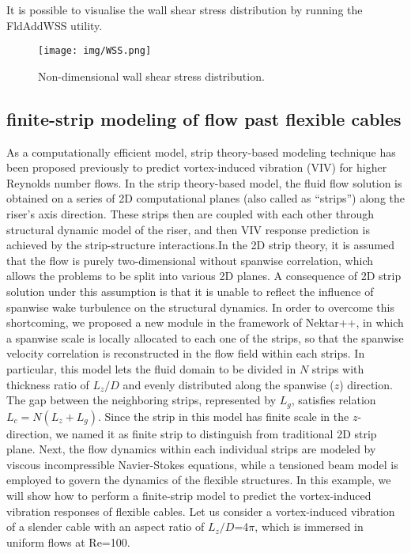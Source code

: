 It is possible to visualise the wall shear stress distribution by running the FldAddWSS utility.

\begin{figure}
\begin{center}
\texttt{[image: img/WSS.png]}
\caption{Non-dimensional wall shear stress distribution.}
\end{center}
\end{figure}

\subsection{finite-strip modeling of flow past flexible cables}

As a computationally efficient model, strip theory-based modeling technique has been proposed previously to predict vortex-induced vibration (VIV) for higher Reynolds number flows. In the strip theory-based model, the fluid flow solution is obtained on a series of 2D computational planes (also called as “strips”) along the riser’s axis direction. These strips then are coupled with each other through structural dynamic model of the riser, and then VIV response prediction is achieved by the strip-structure interactions.In the 2D strip theory, it is assumed that the flow is purely two-dimensional without spanwise correlation, which allows the problems to be split into various 2D planes. A consequence of 2D strip solution under this assumption is that it is unable to reflect the influence of spanwise wake turbulence on the structural dynamics. In order to overcome this shortcoming, we proposed a new module in the framework of Nektar++, in which a spanwise scale is locally allocated to each one of the strips, so that the spanwise velocity correlation is reconstructed in the flow field within each strips. In particular, this model lets the fluid domain to be divided in $N$ strips with thickness ratio of $L_{z}/D$ and evenly distributed along the spanwise ($z$) direction. The gap between the neighboring strips, represented by $L_{g}$, satisfies relation $L_{c}=N(L_{z}+L_{g})$. Since the strip in this model has finite scale in the $z$-direction, we named it as finite strip to distinguish from traditional 2D strip plane. Next, the flow dynamics within each individual strips are modeled by viscous incompressible Navier-Stokes equations, while a tensioned beam model is employed to govern the dynamics of the flexible structures. In this example, we will show how to perform a finite-strip model to predict the vortex-induced vibration responses of flexible cables. Let us consider a vortex-induced vibration of a slender cable with an aspect ratio of $L_z/D$=4$\pi$, which is immersed in uniform flows at Re=100.

